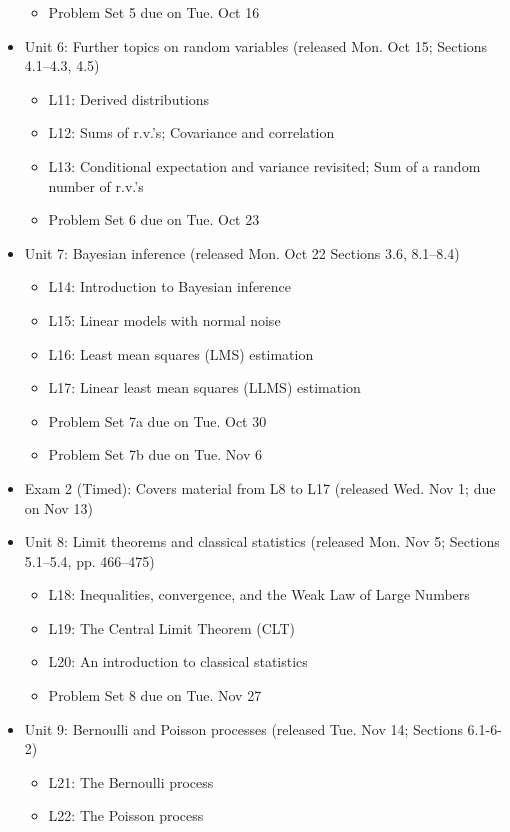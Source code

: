 \documentclass[pdftex, brazil, 12pt, twoside]{article}
\begin{document}
\begin{itemize}[noitemsep]
\begin{itemize}[noitemsep]
  \item Problem Set 5 due on Tue. Oct 16
  \end{itemize}
\item Unit 6: Further topics on random variables (released Mon. Oct 15; Sections 4.1--4.3, 4.5)
  \begin{itemize}[noitemsep]
  \item L11: Derived distributions
  \item L12: Sums of r.v.'s; Covariance and correlation
  \item L13: Conditional expectation and variance revisited; Sum of a random number of r.v.'s
  \item Problem Set 6 due on Tue. Oct 23
  \end{itemize}
\item Unit 7: Bayesian inference (released Mon. Oct 22 Sections 3.6, 8.1--8.4)
  \begin{itemize}[noitemsep]
  \item L14: Introduction to Bayesian inference
  \item L15: Linear models with normal noise
  \item L16: Least mean squares (LMS) estimation
  \item L17: Linear least mean squares (LLMS) estimation
  \item Problem Set 7a due on Tue. Oct 30
  \item Problem Set 7b due on Tue. Nov 6
  \end{itemize}
\item Exam 2 (Timed): Covers material from L8 to L17 (released Wed. Nov 1; due on Nov 13)
\item Unit 8: Limit theorems and classical statistics (released Mon. Nov 5; Sections 5.1--5.4, pp. 466--475)
  \begin{itemize}[noitemsep]
  \item L18: Inequalities, convergence, and the Weak Law of Large Numbers
  \item L19: The Central Limit Theorem (CLT)
  \item L20: An introduction to classical statistics
  \item Problem Set 8 due on Tue. Nov 27
  \end{itemize}
\item Unit 9: Bernoulli and Poisson processes (released Tue. Nov 14; Sections 6.1-6-2)
  \begin{itemize}[noitemsep]
  \item L21: The Bernoulli process
  \item L22: The Poisson process

\end{itemize}
\end{itemize}
\end{document}
